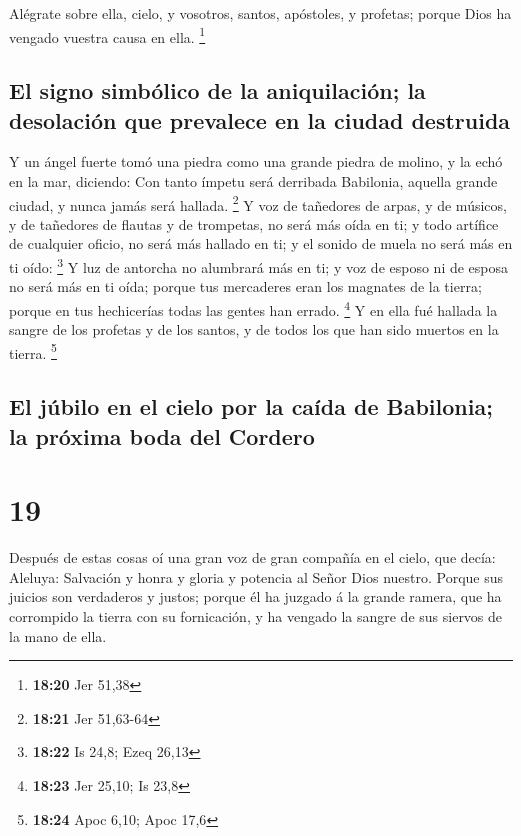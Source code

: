  Alégrate sobre ella, cielo, y vosotros, santos,
apóstoles, y profetas; porque Dios ha vengado vuestra causa en ella.
\footnote{\textbf{18:20} Jer 51,38}

\hypertarget{el-signo-simbuxf3lico-de-la-aniquilaciuxf3n-la-desolaciuxf3n-que-prevalece-en-la-ciudad-destruida}{%
\subsection{El signo simbólico de la aniquilación; la desolación que
prevalece en la ciudad
destruida}\label{el-signo-simbuxf3lico-de-la-aniquilaciuxf3n-la-desolaciuxf3n-que-prevalece-en-la-ciudad-destruida}}

 Y un ángel fuerte tomó una piedra como una grande piedra
de molino, y la echó en la mar, diciendo: Con tanto ímpetu será
derribada Babilonia, aquella grande ciudad, y nunca jamás será hallada.
\footnote{\textbf{18:21} Jer 51,63-64}  Y voz de
tañedores de arpas, y de músicos, y de tañedores de flautas y de
trompetas, no será más oída en ti; y todo artífice de cualquier oficio,
no será más hallado en ti; y el sonido de muela no será más en ti oído:
\footnote{\textbf{18:22} Is 24,8; Ezeq 26,13}  Y luz de
antorcha no alumbrará más en ti; y voz de esposo ni de esposa no será
más en ti oída; porque tus mercaderes eran los magnates de la tierra;
porque en tus hechicerías todas las gentes han errado. \footnote{\textbf{18:23}
  Jer 25,10; Is 23,8}  Y en ella fué hallada la sangre de
los profetas y de los santos, y de todos los que han sido muertos en la
tierra. \footnote{\textbf{18:24} Apoc 6,10; Apoc 17,6}

\hypertarget{el-juxfabilo-en-el-cielo-por-la-cauxedda-de-babilonia-la-pruxf3xima-boda-del-cordero}{%
\subsection{El júbilo en el cielo por la caída de Babilonia; la próxima
boda del
Cordero}\label{el-juxfabilo-en-el-cielo-por-la-cauxedda-de-babilonia-la-pruxf3xima-boda-del-cordero}}

\hypertarget{section-18}{%
\section{19}\label{section-18}}

 Después de estas cosas oí una gran voz de gran compañía
en el cielo, que decía: Aleluya: Salvación y honra y gloria y potencia
al Señor Dios nuestro.  Porque sus juicios son verdaderos
y justos; porque él ha juzgado á la grande ramera, que ha corrompido la
tierra con su fornicación, y ha vengado la sangre de sus siervos de la
mano de ella.

